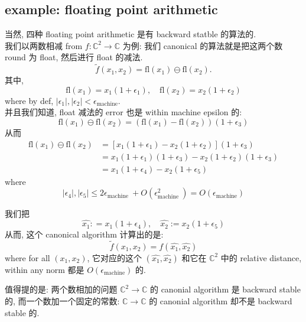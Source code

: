 \subsection{example: floating point arithmetic}
\begin{example}
    当然, 四种 floating point arithmetic 是有 backward statble 的算法的.\\
我们以两数相减 from $f:\mathbb{C}^2 \to \mathbb{C}$ 为例: 我们 canonical 的算法就是把这两个数 round 为 float, 然后进行 float 的减法.
$$
\tilde{f}\left(x_1, x_2\right)=\mathrm{fl}\left(x_1\right) \ominus \mathrm{fl}\left(x_2\right) .
$$
其中, 
$$
\mathrm{fl}\left(x_1\right)=x_1\left(1+\epsilon_1\right), \quad \mathrm{fl}\left(x_2\right)=x_2\left(1+\epsilon_2\right)
$$
where by def, $|\epsilon_1|,|\epsilon_2| < \epsilon_{\text{machine}}$.\\
并且我们知道, float 减法的 error 也是 within machine epsilon 的: $$
\mathrm{fl}\left(x_1\right) \ominus \mathrm{fl}\left(x_2\right)=\left(\mathrm{fl}\left(x_1\right)-\mathrm{fl}\left(x_2\right)\right)\left(1+\epsilon_3\right)
$$
从而$$
\begin{aligned}
\mathrm{fl}\left(x_1\right) \ominus \mathrm{fl}\left(x_2\right) & =\left[x_1\left(1+\epsilon_1\right)-x_2\left(1+\epsilon_2\right)\right]\left(1+\epsilon_3\right) \\
& =x_1\left(1+\epsilon_1\right)\left(1+\epsilon_3\right)-x_2\left(1+\epsilon_2\right)\left(1+\epsilon_3\right) \\
& =x_1\left(1+\epsilon_4\right)-x_2\left(1+\epsilon_5\right)
\end{aligned}
$$
where $$
\left|\epsilon_4\right|,\left|\epsilon_5\right| \leq 2 \epsilon_{\text {machine }}+O\left(\epsilon_{\text {machine }}^2\right) = O(\epsilon_\text {machine})
$$

我们把 \[
\hat{x_1}: = x_1\left(1+\epsilon_4\right), \quad \hat{x_2} :=x_2\left(1+\epsilon_5\right)
\]
从而, 这个 canonical algorithm 计算出的是: \[
\tilde{f} (x_1, x_2) = f (\hat{x_1},\hat{x_2})
\]where for all  $(x_1, x_2) $, 它对应的这个 $ (\hat{x_1},\hat{x_2})$ 和它在 $\mathbb{C}^2$ 中的 relative distance, within any norm 都是 $O(\epsilon_\text {machine})$ 的.
\end{example}
\begin{remark}
值得提的是: 两个数相加的问题 $\mathbb{C}^2 \to \mathbb{C}$ 的 canonial algorithm 是 backward stable 的, 而一个数加一个固定的常数: $\mathbb{C}\to \mathbb{C}$ 的 canonial algorithm 却不是 backward stable 的.
\end{remark}


